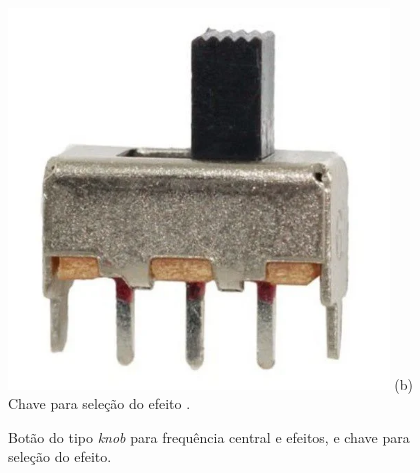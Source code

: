 \begin{figure}[htpb]
\begin{minipage}[t]{0.3\textwidth}
        \includegraphics[width=0.9\textwidth]{figuras/fig62.png}
        \vspace{0.3cm} %
        (b) Chave para seleção do efeito \cite{evea}.
    \end{minipage}

    \caption{Botão do tipo \textit{knob} para frequência central e efeitos, e chave para seleção do efeito.}
    \label{fig61}
\end{figure}





